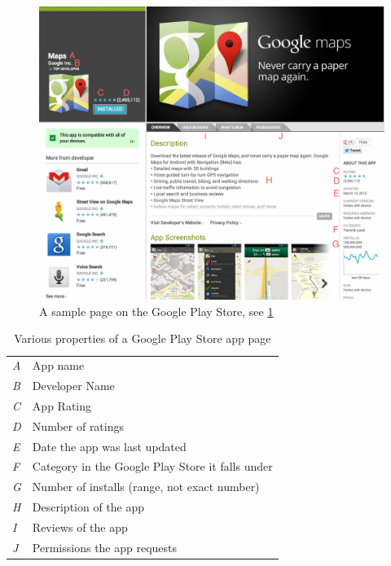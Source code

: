 
\begin{figure}[h]
\begin{center}
\includegraphics[width=0.9\columnwidth]{figs/GPStoreAppPage}
\caption{A sample page on the Google Play Store, see \ref{tab:gpstorekey}}
\label{fig:gpstoreapps}
\end{center}
\end{figure}

\begin{table}[h]
\begin{small}
\begin{tabular}{l|l}

\textit{A} & App name  \\
\textit{B} & Developer Name  \\
\textit{C} & App Rating  \\
\textit{D} & Number of ratings  \\
\textit{E} & Date the app was last updated  \\
\textit{F} & Category in the Google Play Store it falls under  \\
\textit{G} & Number of installs (range, not exact number)  \\
\textit{H} & Description of the app  \\
\textit{I} & Reviews of the app  \\
\textit{J} & Permissions the app requests  \\

\end{tabular}
\end{small}
\caption{Various properties of a Google Play Store app page}
\label{tab:gpstorekey}
\end{table}

